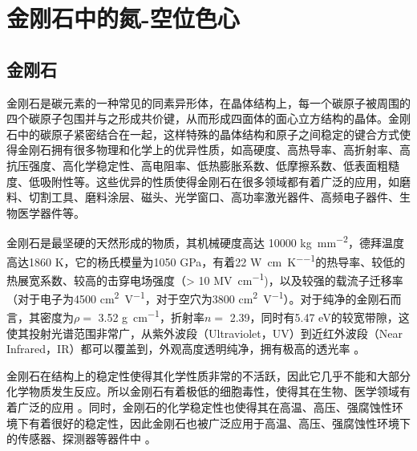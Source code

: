 \documentclass[type = bachelor]{whu-thesis}
\begin{document}

\chapter{金刚石中的氮-空位色心}

\section{金刚石}
金刚石是碳元素的一种常见的同素异形体，在晶体结构上，每一个碳原子被周围的四个碳原子包围并与之形成共价键，从而形成四面体的面心立方结构的晶体。金刚石中的碳原子紧密结合在一起，这样特殊的晶体结构和原子之间稳定的键合方式使得金刚石拥有很多物理和化学上的优异性质，如高硬度、高热导率、高折射率、高抗压强度、高化学稳定性、高电阻率、低热膨胀系数、低摩擦系数、低表面粗糙度、低吸附性等。这些优异的性质使得金刚石在很多领域都有着广泛的应用，如磨料、切割工具、磨料涂层、磁头、光学窗口、高功率激光器件、高频电子器件、生物医学器件等。

金刚石是最坚硬的天然形成的物质，其机械硬度高达 10000 \unit{\kilogram\per\milli\meter\squared}，德拜温度高达1860 \unit{\kelvin}，它的杨氏模量为1050 \unit{\GPa}，有着22 \unit{\watt\per\centi\meter\per\kelvin}的热导率、较低的热展宽系数、较高的击穿电场强度（> 10 \unit{\mega\volt\per\centi\meter})，以及较强的载流子迁移率（对于电子为4500 \unit{\centi\meter\squared\per\volt}，对于空穴为3800 \unit{\centi\meter\squared\per\volt}）。对于纯净的金刚石而言，其密度为$\rho =$ 3.52 \unit{\g\per\cm}，折射率$n =$ 2.39，同时有5.47 \unit{\electronvolt}的较宽带隙，这使其投射光谱范围非常广，从紫外波段（Ultraviolet，UV）到近红外波段（Near Infrared，IR）都可以覆盖到，外观高度透明纯净，拥有极高的透光率 \cite{mildren2013optical, lonvcar2013quantum}。

金刚石在结构上的稳定性使得其化学性质非常的不活跃，因此它几乎不能和大部分化学物质发生反应。所以金刚石有着极低的细胞毒性，使得其在生物、医学领域有着广泛的应用 \cite{schirhagl2014nitrogen,wu2016diamond}。同时，金刚石的化学稳定性也使得其在高温、高压、强腐蚀性环境下有着很好的稳定性，因此金刚石也被广泛应用于高温、高压、强腐蚀性环境下的传感器、探测器等器件中 \cite{umezawa2012high, jayaraman1983diamond}。
\end{document}
